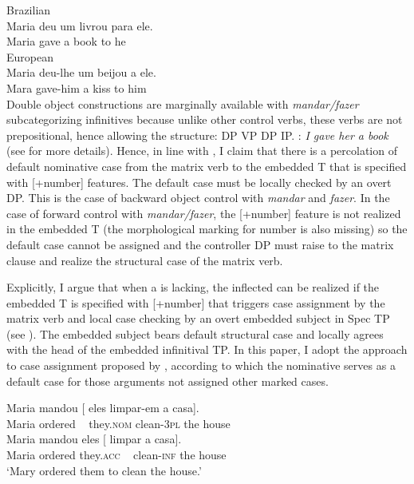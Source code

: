 \documentclass[output=paper]{langsci/langscibook}
\begin{document}
{\ea Brazilian \\
    \gll Maria deu   um livrou para ele.   \\
        Maria gave a     book  to      he\\
\z
\ea European  \\
    \gll Maria deu-lhe   um beijou a  ele. \\  
            Mara  gave-him a    kiss    to him\\
\z
{}Double object constructions are marginally available with \textit{mandar\slash fazer} subcategorizing infinitives because unlike other control verbs, these verbs are not prepositional, hence allowing the structure: DP VP DP IP.} : \textit{I gave her a book} (see \citealt{Larson1991} for more details). Hence, in line with \citet{Raposo1987}, I claim that there is a percolation of default nominative case from the matrix verb to the embedded T that is specified with [+number] features. The default case must be locally checked by an overt DP. This is the case of backward object control with \textit{mandar} and \textit{fazer}. In the case of forward control with \textit{mandar\slash fazer}, the [+number] feature is not realized in the embedded T (the morphological marking for number is also missing) so the default case cannot be assigned and the controller DP must raise to the matrix clause and realize the structural case of the matrix verb.

Explicitly, I argue that when a  is lacking, the inflected  can be realized if the embedded T is specified with [+number] that triggers case assignment by the matrix verb and local case checking by an overt embedded subject in Spec TP (see \citealt{Raposo1987}). The embedded subject bears default structural case and locally agrees with the head of the embedded infinitival TP. In this paper, I adopt the approach to case assignment proposed by \citet{McFadden2011}, according to which the nominative serves as a default case for those arguments not assigned other marked cases.

\ea%
    \label{ex:moreno:28}
    \ea
    \gll Maria mandou [ eles          limpar-em   a     casa].    \\
         Maria ordered  ~ they.\textsc{nom}   clean-\textsc{3pl}     the house\\
    \ex  
    \gll Maria mandou   eles [  limpar      a    casa]. \\
         Maria ordered   they.\textsc{acc}  ~ clean-\textsc{inf} the house \\
    \glt ‘Mary ordered them to clean the house.’
    \z
\z
\end{document}

